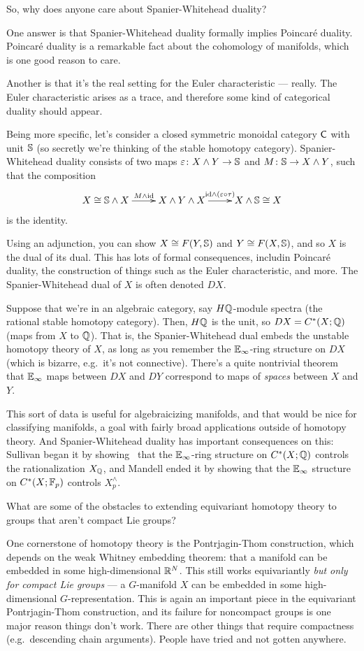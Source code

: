 \begin{ques}
So, why does anyone care about Spanier-Whitehead duality?
\end{ques}
One answer is that Spanier-Whitehead duality formally implies Poincaré duality. Poincaré duality is a remarkable
fact about the cohomology of manifolds, which is one good reason to care.

Another is that it's the real setting for the Euler characteristic --- really. The Euler characteristic arises as a
trace, and therefore some kind of categorical duality should appear.

Being more specific, let's consider a closed symmetric monoidal category $\mathsf C$ with unit $\mathbb S$ (so secretly we're
thinking of the stable homotopy category). Spanier-Whitehead duality consists of two maps $\varepsilon\colon X\wedge
Y\to\mathbb S$ and $M\colon \mathbb S\to X\wedge Y$, such that the composition
\[\xymatrix{
	X\cong \Sph\wedge X\ar[r]^{M\wedge\id} & X\wedge Y\wedge X\ar[r]^{\id\wedge(\e\circ\tau)} &X\wedge\Sph\cong X
}\]
is the identity.

Using an adjunction, you can show $X\cong F(Y,\mathbb S)$ and $Y\cong F(X,\mathbb S)$, and so $X$ is the dual of its dual.
This has lots of formal consequences, includin Poincaré duality, the construction of things such as the Euler
characteristic, and more. The Spanier-Whitehead dual of $X$ is often denoted $DX$.

Suppose that we're in an algebraic category, say $H\mathbb Q$-module spectra (the rational stable homotopy category).
Then, $H\mathbb Q$ is the unit, so $DX = C^*(X;\mathbb Q)$ (maps from $X$ to $\mathbb Q$). That is, the Spanier-Whitehead dual embeds
the unstable homotopy theory of $X$, as long as you remember the $\mathbb E_\infty$-ring structure on $DX$ (which is
bizarre, e.g.\ it's not connective). There's a quite nontrivial theorem that $\mathbb E_\infty$ maps between $DX$ and $DY$
correspond to maps of \emph{spaces} between $X$ and $Y$.

This sort of data is useful for algebraicizing manifolds, and that would be nice for classifying manifolds, a goal
with fairly broad applications outside of homotopy theory. And Spanier-Whitehead duality has important consequences
on this: Sullivan began it by showing~\cite{SullivanQHT} that the $\mathbb E_\infty$-ring structure on $C^*(X;\mathbb Q)$
controls the rationalization $X_\mathbb Q$, and Mandell ended it by showing that the $\mathbb E_\infty$ structure on
$C^*(X;\mathbb F_p)$ controls $X_p^\wedge$.
\begin{ques}
What are some of the obstacles to extending equivariant homotopy theory to groups that aren't compact Lie groups?
\end{ques}
One cornerstone of homotopy theory is the Pontrjagin-Thom construction, which depends on the weak Whitney embedding
theorem: that a manifold can be embedded in some high-dimensional $\mathbb R^N$. This still works equivariantly \emph{but
only for compact Lie groups} --- a $G$-manifold $X$ can be embedded in some high-dimensional $G$-representation.
This is again an important piece in the equivariant Pontrjagin-Thom construction, and its failure for noncompact
groups is one major reason things don't work. There are other things that require compactness (e.g.\ descending
chain arguments). People have tried and not gotten anywhere.

